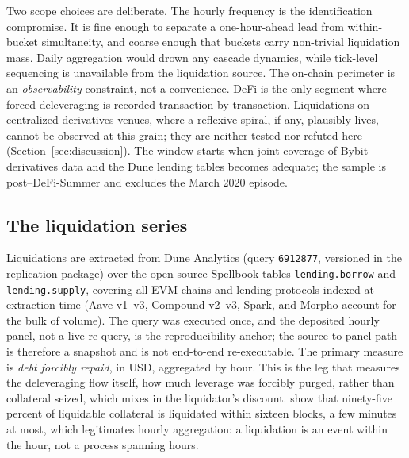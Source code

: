 Two scope choices are deliberate. The hourly frequency is the
identification compromise. It is fine enough to separate a one-hour-ahead lead
from within-bucket simultaneity, and coarse enough that buckets carry
non-trivial liquidation mass. Daily aggregation would drown any cascade
dynamics, while tick-level sequencing is unavailable from the liquidation
source. The on-chain perimeter is an \emph{observability} constraint, not a
convenience. DeFi is the only segment where forced deleveraging is recorded
transaction by transaction. Liquidations on centralized derivatives
venues, where a reflexive spiral, if any, plausibly lives, cannot be
observed at this grain; they are neither tested nor refuted here
(Section~\ref{sec:discussion}). The window starts when joint coverage of
Bybit derivatives data and the Dune lending tables becomes adequate; the
sample is post--DeFi-Summer and excludes the March 2020 episode.

\subsection{The liquidation series}
\label{sec:data-liq}

Liquidations are extracted from Dune Analytics (query \texttt{6912877},
versioned in the replication package) over the open-source Spellbook tables
\texttt{lending.borrow} and \texttt{lending.supply}, covering all EVM chains
and lending protocols indexed at extraction time (Aave v1--v3, Compound
v2--v3, Spark, and Morpho account for the bulk of volume). The query was
executed once, and the deposited hourly panel, not a live re-query, is the
reproducibility anchor; the source-to-panel path is therefore a snapshot and
is not end-to-end re-executable. The primary
measure is \emph{debt forcibly repaid}, in USD, aggregated by hour. This is
the leg that measures the deleveraging flow itself, how much leverage was
forcibly purged, rather than collateral seized, which mixes in the
liquidator's discount. \citet{perez2021} show that ninety-five percent of
liquidable collateral is liquidated within sixteen blocks, a few minutes at
most, which legitimates hourly aggregation: a liquidation is an event within
the hour, not a process spanning hours.

